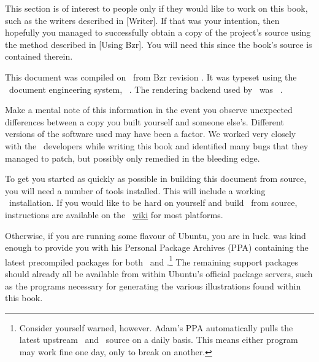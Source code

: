 

This section is of interest to people only if they would like to work on this book, such as the writers described in [Writer]. If that was your intention, then hopefully you managed to successfully obtain a copy of the project's source using the method described in [Using Bzr]. You will need this since the book's source is contained therein.

This document was compiled on \currentdate\ from Bzr revision \BzrRevisionClickable. It was typeset using the \CONTEXT\ document engineering system, \contextmark\ \contextversion. The rendering backend used by \contextmark\ was \texenginename\ \texengineversion. 

Make a mental note of this information in the event you observe unexpected differences between a copy you built yourself and someone else's. Different versions of the software used may have been a factor. We worked very closely with the \CONTEXT\ developers while writing this book and identified many bugs that they managed to patch, but possibly only remedied in the \CONTEXT bleeding edge.

To get you started as quickly as possible in building this document from source, you will need a number of tools installed. This will include a working \CONTEXT\ installation. If you would like to be hard on yourself and build \CONTEXT\ from source, instructions are available on the \CONTEXT\ \href{http://wiki.contextgarden.net/ConTeXt_Minimals}{wiki} for most platforms. 

Otherwise, if you are running some flavour of Ubuntu, you are in luck.  was kind enough to provide you with his Personal Package Archives (PPA) containing the latest precompiled packages for both \CONTEXT\ and \texenginename.\footnote{Consider yourself warned, however. Adam's PPA automatically pulls the latest upstream \CONTEXT\ and \texenginename\ source on a daily basis. This means either program may work fine one day, only to break on another.} The remaining support packages should already all be available from within Ubuntu's official package servers, such as the programs necessary for generating the various illustrations found within this book.

